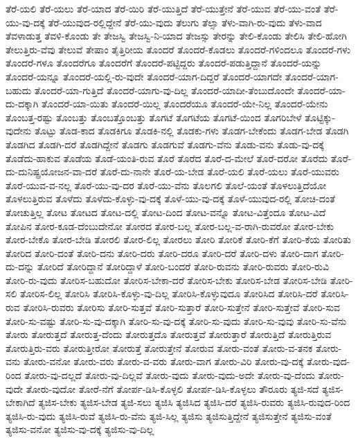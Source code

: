 {ತೆರೆ-ಯಲಿ
ತೆರೆ-ಯಲು
ತೆರೆ-ಯಾದ
ತೆರೆ-ಯಿರಿ
ತೆರೆ-ಯುತ್ತಿದೆ
ತೆರೆ-ಯುತ್ತೇನೆ
ತೆರೆ-ಯುವ
ತೆರೆ-ಯು-ವಂತೆ
ತೆರೆ-ಯು-ವು-ದಕ್ಕೆ
ತೆರೆ-ಯುವುದ-ರಲ್ಲಿದ್ದೇನೆ
ತೆರೆ-ಯು-ವುದು
ತೆಲುಗು
ತೆಲ್ಸಾ
ತೆಳು-ವಾಗಿ-ರು-ವುದು
ತೆಳು-ವಾದ
ತೆವಳಾಡುತ್ತ
ತೆವಳಿ-ಕೊಂಡು
ತೇ
ತೇಜಸ್ವಿ
ತೇಜಸ್ವಿ-ನಿ-ಯಾದ
ತೇಜಸ್ಸು
ತೇರನ್ನು
ತೇಲಿ-ಕೊಂಡು
ತೇಲಿಸಿ
ತೇಲಿ-ಹೋಗಿ
ತೇಲುತ್ತಿರು-ವೆವು
ತೇಲುವೆ
ತೇಷಾಂ
ತೈತ್ತಿರೀಯ
ತೊಂದರೆ
ತೊಂದರೆ-ಕೊಡಲು
ತೊಂದರೆ-ಗಳಿಂದಲೂ
ತೊಂದರೆ-ಗಳು
ತೊಂದರೆ-ಗಳೂ
ತೊಂದರೆಗೂ
ತೊಂದರೆಗೆ
ತೊಂದರೆ-ಪಟ್ಟಿದ್ದರು
ತೊಂದರೆ-ಪಡುತ್ತಿದ್ದಾನೆ
ತೊಂದರೆ-ಯನ್ನು
ತೊಂದರೆ-ಯನ್ನೂ
ತೊಂದರೆ-ಯಲ್ಲಿ-ರು-ವುದೇ
ತೊಂದರೆ-ಯಾಗ-ದಿದ್ದರೆ
ತೊಂದರೆ-ಯಾಗದೇ
ತೊಂದರೆ-ಯಾಗ-ಬಹುದು
ತೊಂದರೆ-ಯಾ-ಗುತ್ತಿದೆ
ತೊಂದರೆ-ಯಾಗು-ವು-ದಿಲ್ಲ
ತೊಂದರೆ-ಯಾದೀ-ತೆಂಬುದೊಂದೇ
ತೊಂದರೆ-ಯಾ-ದು-ದಕ್ಕಾಗಿ
ತೊಂದರೆ-ಯಾ-ಯಿತು
ತೊಂದರೆ-ಯಿಲ್ಲ
ತೊಂದರೆಯೂ
ತೊಂದರೆ-ಯೇ-ನಿಲ್ಲ
ತೊಂದರೆ-ಯೇನು
ತೊಂಬತ್ತ-ರಷ್ಟು
ತೊಂಬತ್ತು
ತೊಂಬತ್ತೊಂಬತ್ತು
ತೊಗಟೆ
ತೊಗಟೆಯ
ತೊಗಟೆ-ಯಿಂದ
ತೊಗರಿಬೇಳೆ
ತೊಟ್ಟಿಕ್ಕು-ವುದೇನು
ತೊಟ್ಟು
ತೊಡ-ಕಾದ
ತೊಡಕಿಗೂ
ತೊಡಕಿ-ನಲ್ಲಿ
ತೊಡಕು-ಗಳು
ತೊಡಗ-ಬೇಕೆಂದು
ತೊಡಗ-ಬೇಡ
ತೊಡಗಿ
ತೊಡಗಿದ
ತೊಡಗಿ-ದರೆ
ತೊಡಗಿದ್ದೇನೆ
ತೊಡಗು
ತೊಡಗುವೆ
ತೊಡಗು-ವೆನು
ತೊಡು-ವನು
ತೊಡು-ವು-ದಕ್ಕೆ
ತೊಡೆದು-ಹಾಕುವ
ತೊಡೆಯ
ತೊಡೆ-ಯಂತಿ-ರುವ
ತೊರೆ
ತೊರೆದ
ತೊರೆ-ದ-ಮೇಲೆ
ತೊರೆ-ದರೋ
ತೊರೆದು
ತೊರೆ-ದು-ದುನಿಷ್ಪ್ರಯೋಜನ-ವಾ-ದರೆ
ತೊರೆ-ದು-ನಾನೇ
ತೊರೆ-ಯ-ಬೇಡ
ತೊರೆ-ಯಲಿ
ತೊರೆ-ಯಲು
ತೊರೆ-ಯುವರು
ತೊರೆ-ಯುವ-ವ-ನಲ್ಲ
ತೊರೆ-ಯು-ವು-ದರ
ತೊರೆ-ಯು-ವೆನು
ತೊಲಗಲಿ
ತೊಲೆ-ಯಂತೆ
ತೊಳಲುತ್ತಿದೆಯೋ
ತೊಳಲುತ್ತಿರುವ
ತೊಳೆದು
ತೊಳೆದು-ಕೊಳ್ಳು-ವು-ದಕ್ಕೆ
ತೊಳೆ-ಯು-ವು-ದಕ್ಕೆ
ತೊಳೆ-ಯುವುದ-ರಲ್ಲಿ
ತೋಚಿ-ದಂತೆ
ತೋಚುತ್ತಿಲ್ಲ
ತೋಟ
ತೋಟದ
ತೋಟ-ದಲ್ಲಿ
ತೋಟ-ದಿಂದ
ತೋಟ-ವನ್ನೊ
ತೋಟ-ವಿತ್ತೆಂದೂ
ತೋಟ-ವಿದೆ
ತೋಪಿನ
ತೋರ-ಕೂಡ-ದೆಂಬುದೇನೋ
ತೋರದ
ತೋರ-ಬಲ್ಲ
ತೋರ-ಬಲ್ಲ-ವ-ರಾಗಿ-ರುವರೋ
ತೋರ-ಬೇಕು
ತೋರ-ಬೇಕೊ
ತೋರ-ಬೇಡಿ
ತೋರಲಿ
ತೋರ-ಲಿಲ್ಲ
ತೋರಲು
ತೋರಿ
ತೋರಿಕೆ
ತೋರಿ-ಕೆಗೆ
ತೋರಿ-ಕೆಯ
ತೋರಿತು
ತೋರಿದ
ತೋರಿ-ದಂತೆ
ತೋರಿ-ದನು
ತೋರಿ-ದರು
ತೋರಿ-ದರೂ
ತೋರಿ-ದರೆ
ತೋರಿ-ದಳು
ತೋರಿ-ದಾಗ
ತೋರಿ-ದು-ದನ್ನು
ತೋರಿದೆ
ತೋರಿದ್ದಾನೆ
ತೋರಿದ್ದಾಳೆ
ತೋರಿ-ಬಂದರೆ
ತೋರಿ-ರುವನು
ತೋರಿ-ರುವರು
ತೋರಿ-ರುವಿ
ತೋರಿ-ರು-ವುದು
ತೋರಿಸ-ಬಹುದೋ
ತೋರಿಸ-ಬೇಕಾ-ದರೆ
ತೋರಿಸ-ಬೇಕು
ತೋರಿಸ-ಬೇಡ
ತೋರಿಸ-ಬೇಡಿ
ತೋರಿ-ಸಲಿ
ತೋರಿಸ-ಲಿಲ್ಲ
ತೋರಿಸಿ
ತೋರಿಸಿ-ಕೊಳ್ಳು-ವು-ದಿಲ್ಲ
ತೋರಿಸಿ-ಕೊಳ್ಳುವುದೂ
ತೋರಿಸಿದ
ತೋರಿಸಿ-ದರೆ
ತೋರಿಸಿ-ರುವ
ತೋರಿಸಿ-ರುವರು
ತೋರಿಸು
ತೋರಿ-ಸುತ್ತವೆ
ತೋರಿ-ಸುತ್ತಾರೆ
ತೋರಿ-ಸುತ್ತೇನೆ
ತೋರಿ-ಸುತ್ತೇವೆ
ತೋರಿ-ಸುವ
ತೋರಿ-ಸು-ವಷ್ಟು
ತೋರಿ-ಸು-ವು-ದಕ್ಕಾಗಿ
ತೋರಿ-ಸು-ವು-ದಕ್ಕೆ
ತೋರಿ-ಸು-ವುದು
ತೋರಿ-ಸು-ವುವು
ತೋರಿ-ಸು-ವೆನು
ತೋರು
ತೋರುತ್ತದೆ
ತೋರುತ್ತ-ದೆಂದು
ತೋರುತ್ತದೊ
ತೋರುತ್ತವೆ
ತೋರುತ್ತಾರೆ
ತೋರುತ್ತಿದೆ
ತೋರುತ್ತಿರುವ
ತೋರುತ್ತಿರು-ವರು
ತೋರುತ್ತೀರೋ
ತೋರುತ್ತೆ
ತೋರುತ್ತೇನೆ
ತೋರುವ
ತೋರು-ವಂತೆ
ತೋರು-ವ-ತನಕ
ತೋರು-ವನು
ತೋರು-ವನೋ
ತೋರು-ವರು
ತೋರು-ವ-ವರು
ತೋರು-ವಾಗ
ತೋರು-ವಿರಿ
ತೋರು-ವು-ದಕ್ಕೆ
ತೋರು-ವುದ-ರಿಂದ
ತೋರು-ವು-ದಲ್ಲದೆ
ತೋರು-ವು-ದಿಲ್ಲವೆ
ತೋರು-ವುದು
ತೋರು-ವುದು-ಅದೇ
ತೋರು-ವು-ದೆಂದು
ತೋರು-ವುದೇ
ತೋರು-ವುದೋ
ತೋರೆ-ನೆಗೆ
ತೋರ್ಪ-ಡಿಸಿ-ಕೊಳ್ಳಲಿ
ತೋರ್ಪ-ಡಿಸಿ-ಕೊಳ್ಳಲು
ತೌರೂರು
ತ್ಯಜಿ-ಸದೆ
ತ್ಯಜಿಸ-ಬೇಕಾಗಿದೆ
ತ್ಯಜಿಸ-ಬೇಕು
ತ್ಯಜಿಸ-ಬೇಡ
ತ್ಯಜಿ-ಸಲು
ತ್ಯಜಿಸಿ
ತ್ಯಜಿಸಿದ
ತ್ಯಜಿಸಿ-ದರೆ
ತ್ಯಜಿಸಿ-ರುವರು
ತ್ಯಜಿಸಿ-ರುವುದ-ರಿಂದ
ತ್ಯಜಿಸಿ-ರು-ವುದು
ತ್ಯಜಿಸಿ-ರುವೆ
ತ್ಯಜಿಸಿ-ರು-ವೆನು
ತ್ಯಜಿ-ಸಿಲ್ಲ
ತ್ಯಜಿಸು
ತ್ಯಜಿಸುತ್ತಿದ್ದೇನೆ
ತ್ಯಜಿಸುತ್ತೇನೆ
ತ್ಯಜಿಸು-ವಂತೆ
ತ್ಯಜಿಸು-ವನೋ
ತ್ಯಜಿಸು-ವು-ದಕ್ಕೆ
ತ್ಯಜಿಸು-ವು-ದಿಲ್ಲ
}
